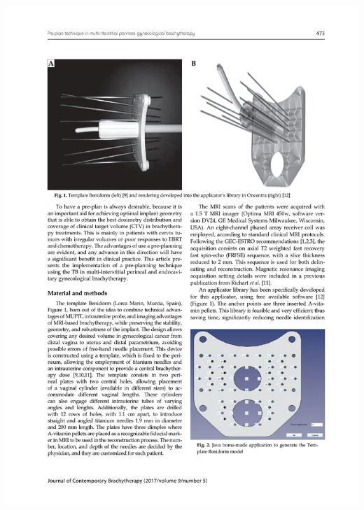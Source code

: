 \documentclass[
  a4paper,
]{scrreprt}
\begin{document}
\includegraphics{articulos/preplan/preplan-2.png}
\end{document}

